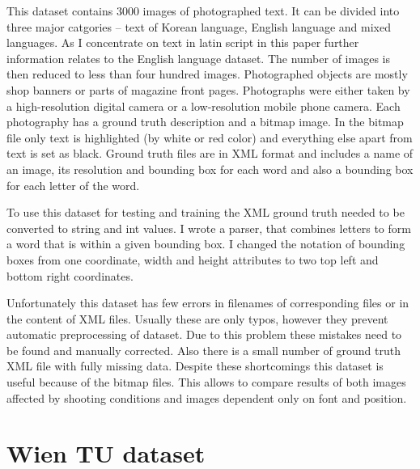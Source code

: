 This dataset contains 3000 images of photographed text. It can be divided into three major catgories -- text of Korean language, English language and mixed languages. As I concentrate on text in latin script in this paper further information relates to the English language dataset. The number of images is then reduced to less than four hundred images. Photographed objects are mostly shop banners or parts of magazine front pages. Photographs were either taken by a high-resolution digital camera or a low-resolution mobile phone camera.\cite{kaist} Each photography has a ground truth description and a bitmap image. In the bitmap file only text is highlighted (by white or red color) and everything else apart from text is set as black. Ground truth files are in XML format and includes a name of an image, its resolution and bounding box for each word and also a bounding box for each letter of the word.

To use this dataset for testing and training the XML ground truth needed to be converted to string and int values. I wrote a parser, that combines letters to form a word that is within a given bounding box. I changed the notation of bounding boxes from one coordinate, width and height attributes to two top left and bottom right coordinates.

Unfortunately this dataset has few errors in filenames of corresponding files or in the content of XML files. Usually these are only typos, however they prevent automatic preprocessing of dataset. Due to this problem these mistakes need to be found and  manually corrected. Also there is a small number of ground truth XML file with fully missing data. 
Despite these shortcomings this dataset is useful because of the bitmap files. This allows to compare results of both images affected by shooting conditions and images dependent only on font and position.

\section{Wien TU dataset}

